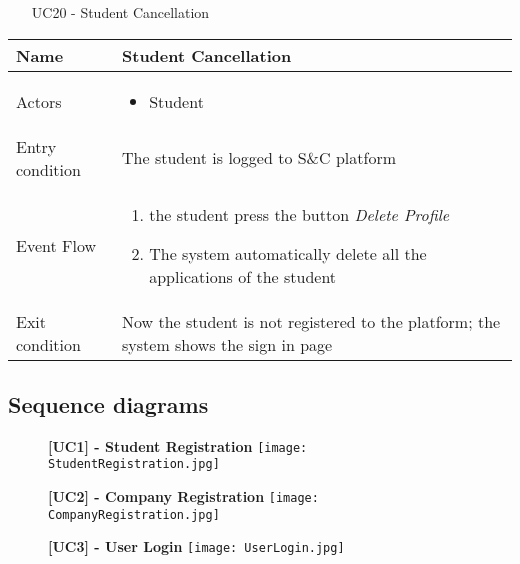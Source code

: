 				\begin{table} [H]
					\centering
					\begin{itemize}
						\item [UC20] - Student Cancellation
					\end{itemize}
					
					\begin{tabular}{|| P{7.5cm} | P{7.5cm} ||}
						\hline
						Name & Student Cancellation \\
						\hline
						Actors & \parbox{5cm}{\begin{itemize}
								\item Student
							\end{itemize}
						} \\
						\hline
						Entry condition & The student is logged to S\&C platform \\
						\hline
						Event Flow & \parbox{5cm}{\begin{enumerate}[label=\alpha]
								\item the student press the button \textit{Delete Profile}
								\item The system automatically delete 
								all the applications of the student
						\end{enumerate}} \\
						\hline 
						Exit condition & Now the student is not registered to 
						the platform; the system shows the sign
						in page  \\
						\hline
					\end{tabular}
				\end{table}
				
		\subsection{Sequence diagrams}
		
			\begin{figure}[H]
				\centering
				{\bfseries [UC1] - Student Registration}
				\texttt{[image: StudentRegistration.jpg]}
				
			\end{figure}
			
			\begin{figure}[H]
				\centering
				{\bfseries [UC2] - Company Registration}
				\texttt{[image: CompanyRegistration.jpg]}
				
			\end{figure}
			
			\begin{figure}[H]
				\centering
				{\bfseries [UC3] - User Login}
				\texttt{[image: UserLogin.jpg]}
				
			\end{figure}
			
